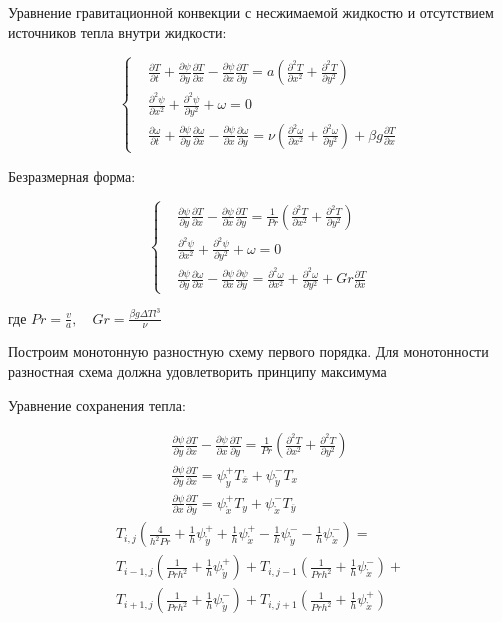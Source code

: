 \documentclass[a4paper, 12pt]{article}
\numberwithin{equation}{section}
\newcommand{\der}[2]{\frac{\partial {#1}}{\partial {#2}}}
\newcommand{\dder}[2]{\frac{\partial^2 {#1}}{\partial {#2}^2}}
\begin{document}
  Уравнение гравитационной конвекции с несжимаемой жидкостю и отсутствием
  источников тепла внутри жидкости:

  $$
    \left\{
      \begin{aligned}
        &\der{T}{t} + \der{\psi}{y} \der{T}{x} - \der{\psi}{x} \der{T}{y} =
          a \left( \dder{T}{x} + \dder{T}{y} \right)
        \\
        &\dder{\psi}{x} + \dder{\psi}{y} + \omega = 0
        \\
        &\der{\omega}{t} + \der{\psi}{y} \der{\omega}{x} - \der{\psi}{x}
          \der{\omega}{y} = \nu \left(
            \dder{\omega}{x} + \dder{\omega}{y}
          \right) + \beta g \der{T}{x}
      \end{aligned}
    \right.
  $$

  Безразмерная форма:

  $$
    \left\{
      \begin{aligned}
        &\der{\psi}{y} \der{T}{x} - \der{\psi}{x} \der{T}{y} = \frac{1}{Pr}
          \left( \dder{T}{x} + \dder{T}{y} \right)
        \\
        &\dder{\psi}{x} + \dder{\psi}{y} + \omega = 0
        \\
        &\der{\psi}{y} \der{\omega}{x} - \der{\psi}{x} \der{\psi}{y} =
          \dder{\omega}{x} + \dder{\omega}{y} + Gr \der{T}{x}
      \end{aligned}
    \right.
  $$

  где $Pr = \frac{v}{a}, \quad Gr = \frac{\beta g \Delta T l^{3}}{\nu}$

  Построим монотонную разностную схему первого порядка. Для монотонности
  разностная схема должна удовлетворить принципу максимума

  Уравнение сохранения тепла:

  \begin{gather*}
    \der{\psi}{y} \der{T}{x} - \der{\psi}{x} \der{T}{y} = \frac{1}{Pr}
      \left( \dder{T}{x} + \dder{T}{y} \right)
    \\
    \der{\psi}{y} \der{T}{x} = \psi_{\mathring{y}}^{+} T_{\overline{x}} +
      \psi_{\mathring{y}}^{-} T_{x}
    \\
    \der{\psi}{x} \der{T}{y} = \psi_{\mathring{x}}^{+} T_{y} +
      \psi_{\mathring{x}}^{-} T_{\overline{y}}
  \end{gather*}
  \begin{multline*}
    T_{i,j}\left(
      \frac{4}{h^2 Pr} +
      \frac{1}{h} \psi_{\mathring{y}}^{+} +
      \frac{1}{h} \psi_{\mathring{x}}^{+} -
      \frac{1}{h} \psi_{\mathring{y}}^{-} -
      \frac{1}{h} \psi_{\mathring{x}}^{-}
    \right) = \\
      T_{i-1,j}\left(
        \frac{1}{Pr h^2} + \frac{1}{h} \psi_{\mathring{y}}^{+}
      \right) +
      T_{i,j-1}\left(
        \frac{1}{Pr h^2} + \frac{1}{h} \psi_{\mathring{x}}^{-}
      \right) + \\
      T_{i+1,j}\left(
        \frac{1}{Pr h^2} + \frac{1}{h} \psi_{\mathring{y}}^{-}
      \right) +
      T_{i,j+1}\left(
        \frac{1}{Pr h^2} + \frac{1}{h} \psi_{\mathring{x}}^{+}
      \right)
  \end{multline*}
\end{document}
